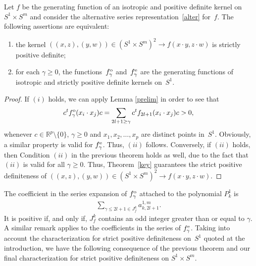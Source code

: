 \begin{Theorem}
Let $f$ be the generating function of an isotropic and positive definite kernel on~\mbox{$S^1 \times S^m$} and consider the alternative series representation~\eqref{alter} for~$f$. The following assertions are equivalent:
\begin{enumerate}\itemsep=0pt
\item[$(i)$] the kernel $((x,z), (y,w)) \in (S^1 \times S^m)^2 \to f(x \cdot y, z \cdot w)$ is strictly positive definite;
\item[$(ii)$] for each $\gamma \geq 0$, the functions~$f_\gamma^{\rm o}$ and~$f_{\gamma}^{\rm e}$ are the generating functions of isotropic and strictly positive definite kernels on~$S^1$.
\end{enumerate}
\end{Theorem}
\begin{proof} If $(i)$ holds, we can apply Lemma \ref{prelim} in order to see that
\begin{gather*}c^t f_\gamma^{\rm o}(x_i \cdot x_j)c =\sum_{2l+1\geq \gamma} c^t f_{2l+1}(x_i \cdot x_j)c >0,\end{gather*}
whenever $c \in \mathbb{R}^p\setminus\{0\}$, $\gamma \geq 0$ and $x_1, x_2, \ldots, x_p$ are distinct points in~$S^1$. Obviously, a similar property is valid for
$f_\gamma^{\rm e}$. Thus, $(ii)$ follows. Conversely, if $(ii)$ holds, then Condition $(ii)$ in the previous theorem holds as well, due to the fact that $(ii)$ is valid for all $\gamma\geq 0$. Thus, Theo\-rem~\ref{key} guarantees the strict positive def\/initeness of $((x,z), (y,w)) \in (S^1 \times S^m)^2 \to f(x \cdot y, z \cdot w)$.
\end{proof}

The coef\/f\/icient in the series expansion of $f_\gamma^{\rm o}$ attached to the polynomial $P_k^1$ is
\begin{gather*}\sum_{\gamma \leq 2l+1 \in J_f^k} a_{k,2l+1}^{1,m}.\end{gather*}
It is positive if, and only if, $J_f^k$ contains an odd integer greater than or equal to $\gamma$. A similar remark applies to the coef\/f\/icients in the series of $f_\gamma^{\rm e}$. Taking into account the characterization for strict positive def\/initeness on~$S^1$ quoted at the introduction, we have the following consequence of the previous theorem and our f\/inal characterization for strict positive def\/initeness on $S^1 \times S^m$.

